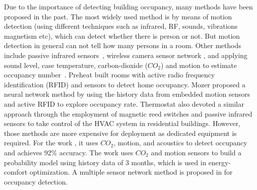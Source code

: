 Due to the importance of detecting building occupancy, many methods
have been proposed in the past. The most widely used method is by
means of motion detection (using different techniques such as infrared,
RF, sounds, vibrations magnetism etc), which can detect whether there is
person or not. But motion detection in general can not tell how many
persons in a room.  Other methods include passive infrared
sensors~\cite{Dodier2006Building}, wireless camera sensor network
\cite{erickson2009energy}, and applying sound level, case temperature,
carbon-dioxide ($CO_2$) and motion to estimate occupancy
number~\cite{Ekwevugbe2013Real}.  Preheat \cite{scott2011ctrl} built
rooms with active radio frequency identification (RFID) and sensors to
detect home occupancy. Mozer \cite{mozer1997neurothermostat} proposed
a neural network method by using the history data from embedded motion
sensors and active RFID to explore occupancy rate. Thermostat
\cite{lu2010smartthermostat} also devoted a similar approach through
the employment of magnetic reed switches and passive infrared sensors
to take control of the HVAC system in residential buildings. However, those methods are
more expensive for deployment as dedicated equipment is required.
For the work \cite{dong2014real}, it uses $CO_2$,
  motion, and acoustics to detect occupancy and achieves 92\%
  accuracy.  The work \cite{majumdar2014energy} uses $CO_2$ and motion
  sensors to build a probability model using history data of 3 months, which is
  used in energy-comfort optimization. A multiple sensor network
  method is proposed in \cite{yang2016review} for occupancy
  detection.

